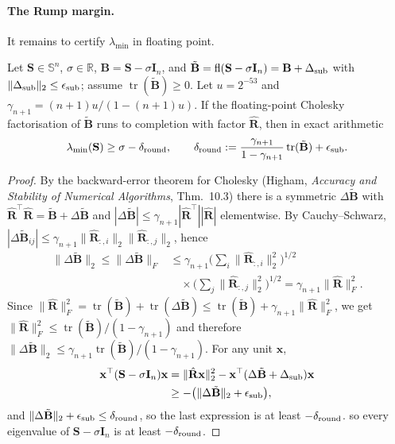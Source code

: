 \paragraph{The Rump margin.} It remains to certify $\lambda_{\min}$ in floating point.
\begin{lemma}\label{lem:rump}
Let $\mathbf S\in\mathbb S^n$, $\sigma\in\mathbb R$, $\mathbf B=\mathbf S-\sigma\mathbf I_n$, and $\tilde{\mathbf B}=\operatorname{fl}(\mathbf S-\sigma\mathbf I_n)=\mathbf B+\Delta_{\rm sub}$ with $\|\Delta_{\rm sub}\|_2\le\epsilon_{\rm sub}$; assume $\operatorname{tr}(\tilde{\mathbf B})\ge0$. Let $u=2^{-53}$ and $\gamma_{n+1}=(n+1)u/(1-(n+1)u)$. If the floating-point Cholesky factorisation of $\tilde{\mathbf B}$ runs to completion with factor $\hat{\mathbf R}$, then in exact arithmetic
\begin{equation}
\lambda_{\min}(\mathbf S)\ge\sigma-\delta_{\rm round},\qquad
\delta_{\rm round}:=\frac{\gamma_{n+1}}{1-\gamma_{n+1}}\operatorname{tr}(\tilde{\mathbf B})+\epsilon_{\rm sub}.
\label{eq:rump}
\end{equation}
\end{lemma}
\begin{proof}
By the backward-error theorem for Cholesky (Higham, \emph{Accuracy and Stability of Numerical Algorithms}, Thm.~10.3) there is a symmetric $\Delta\tilde{\mathbf B}$ with $\hat{\mathbf R}^\top\hat{\mathbf R}=\tilde{\mathbf B}+\Delta\tilde{\mathbf B}$ and $|\Delta\tilde{\mathbf B}|\le\gamma_{n+1}|\hat{\mathbf R}^\top||\hat{\mathbf R}|$ elementwise. By Cauchy--Schwarz, $|\Delta\tilde{\mathbf B}_{ij}|\le\gamma_{n+1}\|\hat{\mathbf R}_{:,i}\|_2\|\hat{\mathbf R}_{:,j}\|_2$, hence
\begin{equation}
\begin{aligned}
\|\Delta\tilde{\mathbf B}\|_2\le\|\Delta\tilde{\mathbf B}\|_F
&\le\gamma_{n+1}\Big(\sum_i\|\hat{\mathbf R}_{:,i}\|_2^2\Big)^{1/2}\\
&\quad\times\Big(\sum_j\|\hat{\mathbf R}_{:,j}\|_2^2\Big)^{1/2}
=\gamma_{n+1}\|\hat{\mathbf R}\|_F^2 .
\end{aligned}
\end{equation}
Since $\|\hat{\mathbf R}\|_F^2=\operatorname{tr}(\tilde{\mathbf B})+\operatorname{tr}(\Delta\tilde{\mathbf B})\le\operatorname{tr}(\tilde{\mathbf B})+\gamma_{n+1}\|\hat{\mathbf R}\|_F^2$, we get $\|\hat{\mathbf R}\|_F^2\le\operatorname{tr}(\tilde{\mathbf B})/(1-\gamma_{n+1})$ and therefore $\|\Delta\tilde{\mathbf B}\|_2\le\gamma_{n+1}\operatorname{tr}(\tilde{\mathbf B})/(1-\gamma_{n+1})$. For any unit $\mathbf x$,
\begin{equation}
\begin{aligned}
\mathbf x^\top(\mathbf S-\sigma\mathbf I_n)\mathbf x
&=\|\hat{\mathbf R}\mathbf x\|_2^2-\mathbf x^\top(\Delta\tilde{\mathbf B}+\Delta_{\rm sub})\mathbf x\\
&\ge-\big(\|\Delta\tilde{\mathbf B}\|_2+\epsilon_{\rm sub}\big),
\end{aligned}
\end{equation}
and $\|\Delta\tilde{\mathbf B}\|_2+\epsilon_{\rm sub}\le\delta_{\rm round}$, so the last expression is at least $-\delta_{\rm round}$.
so every eigenvalue of $\mathbf S-\sigma\mathbf I_n$ is at least $-\delta_{\rm round}$.
\end{proof}
